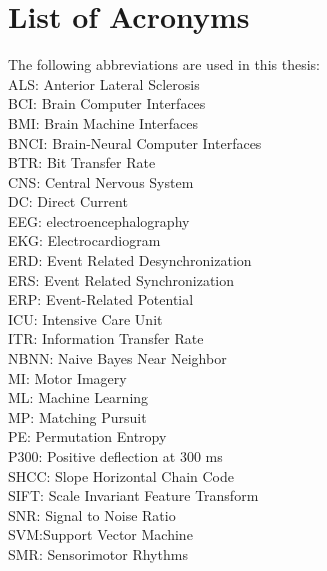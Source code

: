\chapter*{List of Acronyms}

The following abbreviations are used in this thesis:\\

\noindent ALS: Anterior Lateral Sclerosis\\
BCI: Brain Computer Interfaces\\
BMI: Brain Machine Interfaces\\
BNCI: Brain-Neural Computer Interfaces\\
BTR: Bit Transfer Rate\\
CNS: Central Nervous System\\
DC: Direct Current\\
EEG: electroencephalography\\
EKG: Electrocardiogram\\
ERD: Event Related Desynchronization\\
ERS: Event Related Synchronization\\
ERP: Event-Related Potential\\
ICU: Intensive Care Unit\\
ITR: Information Transfer Rate\\
NBNN: Naive Bayes Near Neighbor\\
MI: Motor Imagery\\
ML: Machine Learning\\
MP: Matching Pursuit\\
PE: Permutation Entropy\\
P300: Positive deflection at 300 ms\\
SHCC: Slope Horizontal Chain Code\\
SIFT: Scale Invariant Feature Transform\\
SNR: Signal to Noise Ratio\\
SVM:Support Vector Machine\\
SMR: Sensorimotor Rhythms\\



